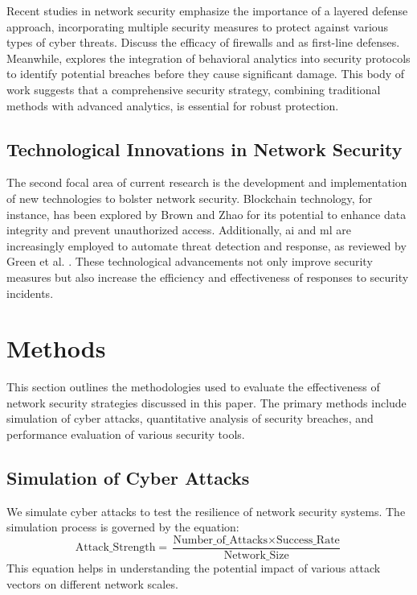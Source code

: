 \documentclass[a4paper,conference]{IEEEtran}
\begin{document}
Recent studies in network security emphasize the importance of a layered defense approach, incorporating multiple security measures to protect against various types of cyber threats. 
Discuss the efficacy of firewalls and  as first-line defenses. 
Meanwhile, \cite{antonelloDeepPacketInspection2012a} explores the integration of behavioral analytics into security protocols to identify potential breaches before they cause significant damage.
This body of work suggests that a comprehensive security strategy, combining traditional methods with advanced analytics, is essential for robust protection.

\subsection{Technological Innovations in Network Security}

The second focal area of current research is the development and implementation of new technologies to bolster network security. Blockchain technology, for instance, has been explored by Brown and Zhao \cite{auldBayesianNeuralNetworks2007} for its potential to enhance data integrity and prevent unauthorized access. Additionally, \gls{ai} and \gls{ml} are increasingly employed to automate threat detection and response, as reviewed by Green et al. \cite{shajiMethodologicalReviewAttack2019}. These technological advancements not only improve security measures but also increase the efficiency and effectiveness of responses to security incidents.

\section{Methods}

This section outlines the methodologies used to evaluate the effectiveness of network security strategies discussed in this paper.
The primary methods include simulation of cyber attacks, quantitative analysis of security breaches, and performance evaluation of various security tools.

\subsection{Simulation of Cyber Attacks}

We simulate cyber attacks to test the resilience of network security systems.
The simulation process is governed by the equation:
\begin{equation}
\text{Attack\_Strength} = \frac{\text{Number\_of\_Attacks} \times \text{Success\_Rate}}{\text{Network\_Size}}
\end{equation}
This equation helps in understanding the potential impact of various attack vectors on different network scales.
\end{document}
